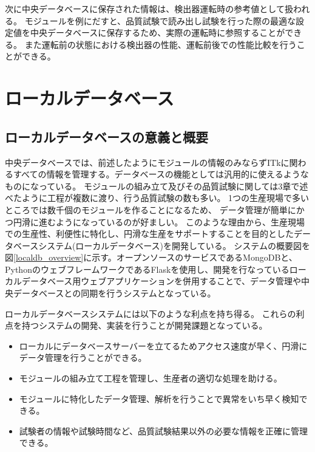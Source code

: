次に中央データベースに保存された情報は、検出器運転時の参考値として扱われる。
モジュールを例にだすと、品質試験で読み出し試験を行った際の最適な設定値を中央データベースに保存するため、実際の運転時に参照することができる。
また運転前の状態における検出器の性能、運転前後での性能比較を行うことができる。

\clearpage
\section{ローカルデータベース}
\subsection{ローカルデータベースの意義と概要}
中央データベースでは、前述したようにモジュールの情報のみならずITkに関わるすべての情報を管理する。データベースの機能としては汎用的に使えるようなものになっている。
モジュールの組み立て及びその品質試験に関しては3章で述べたように工程が複数に渡り、行う品質試験の数も多い。
1つの生産現場で多いところでは数千個のモジュールを作ることになるため、
データ管理が簡単にかつ円滑に進むようになっているのが好ましい。
このような理由から、生産現場での生産性、利便性に特化し、円滑な生産をサポートすることを目的としたデータベースシステム(ローカルデータベース)を開発している。
システムの概要図を図\ref{localdb_overview}に示す。オープンソースのサービスであるMongoDB\cite{4-1}と、
PythonのウェブフレームワークであるFlask\cite{4-3}を使用し、開発を行なっているローカルデータベース用ウェブアプリケーションを併用することで、データ管理や中央データベースとの同期を行うシステムとなっている。

ローカルデータベースシステムには以下のような利点を持ち得る。
これらの利点を持つシステムの開発、実装を行うことが開発課題となっている。

\begin{itemize}
  \item ローカルにデータベースサーバーを立てるためアクセス速度が早く、円滑にデータ管理を行うことができる。
  \item モジュールの組み立て工程を管理し、生産者の適切な処理を助ける。
  \item モジュールに特化したデータ管理、解析を行うことで異常をいち早く検知できる。
  \item 試験者の情報や試験時間など、品質試験結果以外の必要な情報を正確に管理できる。
\end{itemize}

